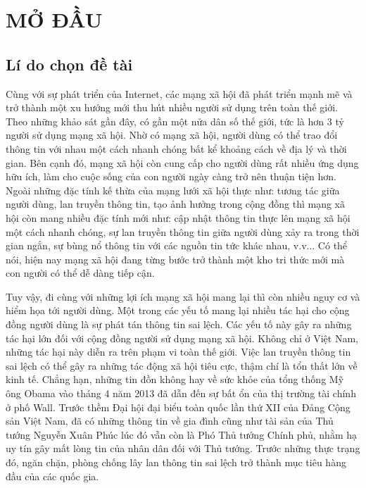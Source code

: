 \chapter* {MỞ ĐẦU}

\tocless\section {Lí do chọn đề tài}
Cùng với sự phát triển của Internet, các mạng xã hội đã phát triển mạnh mẽ và trở thành một xu hướng mới thu hút nhiều người sử dụng trên toàn thế giới. Theo những khảo sát gần đây, có gần một nửa dân số thế giới, tức là hơn 3 tỷ người sử dụng mạng xã hội. Nhờ có mạng xã hội, người dùng có thể trao đổi thông tin với nhau một cách nhanh chóng bất kể khoảng cách về địa lý và thời gian. Bên cạnh đó, mạng xã hội còn cung cấp cho người dùng rất nhiều ứng dụng hữu ích, làm cho cuộc sống của con người ngày càng trở nên thuận tiện hơn. Ngoài những đặc tính kế thừa của mạng lưới xã hội thực như: tương tác giữa người dùng, lan truyền thông tin, tạo ảnh hưởng trong cộng đồng thì mạng xã hội còn mang nhiều đặc tính mới như: cập nhật thông tin thực lên mạng xã hội một cách nhanh chóng, sự lan truyền thông tin giữa người dùng xảy ra trong thời gian ngắn, sự bùng nổ thông tin với các nguồn tin tức khác nhau, v.v... Có thể nói, hiện nay mạng xã hội đang từng bước trở thành một kho tri thức mới mà con người có thể dễ dàng tiếp cận.

Tuy vậy, đi cùng với những lợi ích mạng xã hội mang lại thì còn nhiều nguy cơ và hiểm họa tới người dùng. Một trong các yếu tố mang lại nhiều tác hại cho cộng đồng người dùng là sự phát tán thông tin sai lệch. Các yếu tố này gây ra những tác hại lớn đối với cộng đồng người sử dụng mạng xã hội. Không chỉ ở Việt Nam, những tác hại này diễn ra trên phạm vi toàn thế giới. Việc lan truyền thông tin sai lệch có thể gây ra những tác động xã hội tiêu cực, thậm chí là tổn thất lớn về kinh tế. Chẳng hạn, những tin đồn không hay về sức khỏe của tổng thống Mỹ ông Obama vào tháng 4 năm 2013 đã dẫn đến sự bất ổn của thị trường tài chính ở phố Wall. Trước thềm Đại hội đại biểu toàn quốc lần thứ XII của Đảng Cộng sản Việt Nam, đã có những thông tin về gia đình cũng như tài sản của Thủ tướng Nguyễn Xuân Phúc lúc đó vẫn còn là Phó Thủ tướng Chính phủ, nhằm hạ uy tín gây mất lòng tin của nhân dân đối với Thủ tướng. Trước những thực trạng đó, ngăn chặn, phòng chống lây lan thông tin sai lệch trở thành mục tiêu hàng đầu của các quốc gia.

